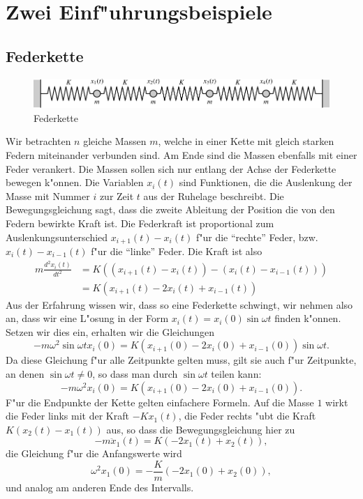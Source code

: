 \section{Zwei Einf"uhrungsbeispiele}
\subsection{Federkette}
\begin{figure}
\begin{center}
\includegraphics[width=\hsize]{images/e-1}
\end{center}
\caption{Federkette}
\end{figure}
Wir betrachten $n$ gleiche Massen $m$, welche in einer Kette mit gleich
starken Federn miteinander verbunden sind.
Am Ende sind die Massen
ebenfalls mit einer Feder verankert.
Die Massen sollen sich nur entlang der Achse der Federkette bewegen k"onnen.
Die Variablen $x_i(t)$ sind Funktionen, die die Auslenkung der Masse mit
Nummer $i$ zur Zeit $t$ aus der Ruhelage beschreibt.
Die Bewegungsgleichung sagt,
dass die zweite Ableitung der Position die von den Federn bewirkte Kraft
ist.
Die Federkraft ist proportional zum Auslenkungsunterschied
$x_{i+1}(t)-x_i(t)$ f"ur die ``rechte'' Feder, bzw.~
$x_{i}(t)-x_{i-1}(t)$ f"ur die ``linke'' Feder.
Die Kraft ist also
\begin{align*}
m\frac{d^2x_i(t)}{dt^2}
&=K((x_{i+1}(t)-x_i(t))-(x_i(t)-x_{i-1}(t)))\\
&=K(x_{i+1}(t)-2x_i(t)+x_{i-1}(t))
\end{align*}
Aus der Erfahrung wissen wir, dass so eine Federkette schwingt, wir nehmen also
an, dass wir eine L"osung in der Form $x_i(t)=x_i(0)\sin\omega t$ finden
k"onnen.
Setzen wir dies ein, erhalten wir die Gleichungen
\[
-m\omega^2\sin\omega t x_i(0)=K(x_{i+1}(0)-2x_i(0)+x_{i-1}(0))\sin\omega t.
\]
Da diese Gleichung f"ur alle Zeitpunkte gelten muss, gilt sie auch f"ur
Zeitpunkte, an denen $\sin\omega t\ne 0$, so dass man durch $\sin\omega t$
teilen kann:
\[
-m\omega^2 x_i(0)=K(x_{i+1}(0)-2x_i(0)+x_{i-1}(0)).
\]
F"ur die Endpunkte der Kette gelten einfachere Formeln.
Auf die Masse $1$
wirkt die Feder links mit der Kraft $-Kx_1(t)$, die Feder rechts "ubt die
Kraft $K(x_2(t)-x_1(t))$ aus, so dass die Bewegungsgleichung hier zu
\[
-m\ddot x_1(t)=K(-2x_1(t)+x_2(t)),
\]
die Gleichung f"ur die Anfangswerte wird
\[
\omega^2 x_1(0)=-\frac{K}{m}(-2x_1(0)+x_2(0)),
\]
und analog am anderen Ende des Intervalls.

